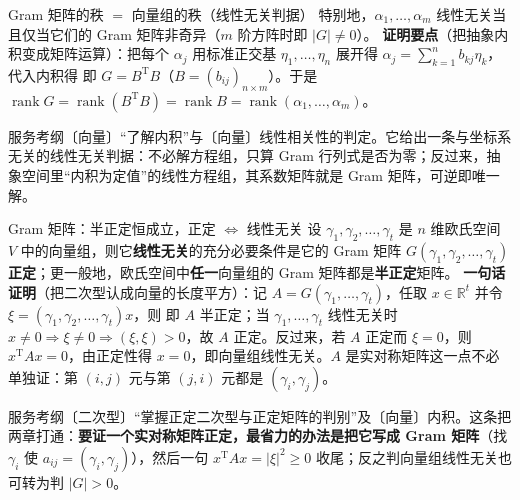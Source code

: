 \begin{fdeep}{Gram 矩阵的秩 $=$ 向量组的秩（线性无关判据）}
特别地，$\alpha_{1},\dots,\alpha_{m}$ 线性无关当且仅当它们的 Gram 矩阵非奇异（$m$ 阶方阵时即 $|G|\ne0$）。
\textbf{证明要点}（把抽象内积变成矩阵运算）：把每个 $\alpha_{j}$ 用标准正交基 $\eta_{1},\dots,\eta_{n}$ 展开得 $\alpha_{j}=\sum_{k=1}^{n}b_{kj}\eta_{k}$，代入内积得
即 $G=B^{\mathrm T}B$（$B=(b_{ij})_{n\times m}$）。于是 $\operatorname{rank}G=\operatorname{rank}(B^{\mathrm T}B)=\operatorname{rank}B=\operatorname{rank}(\alpha_{1},\dots,\alpha_{m})$。

\fbref{}服务考纲〔向量〕“了解内积”与〔向量〕线性相关性的判定。它给出一条与坐标系无关的线性无关判据：不必解方程组，只算 Gram 行列式是否为零；反过来，抽象空间里“内积为定值”的线性方程组，其系数矩阵就是 Gram 矩阵，可逆即唯一解。
\end{fdeep}

\begin{fdeep}{Gram 矩阵：半正定恒成立，正定 $\iff$ 线性无关}
设 $\gamma_{1},\gamma_{2},\dots,\gamma_{t}$ 是 $n$ 维欧氏空间 $V$ 中的向量组，则它\textbf{线性无关}的充分必要条件是它的 Gram 矩阵 $G(\gamma_{1},\gamma_{2},\dots,\gamma_{t})$ \textbf{正定}；更一般地，欧氏空间中\textbf{任一}向量组的 Gram 矩阵都是\textbf{半正定}矩阵。
\textbf{一句话证明}（把二次型认成向量的长度平方）：记 $A=G(\gamma_{1},\dots,\gamma_{t})$，任取 $x\in\mathbb R^{t}$ 并令 $\xi=(\gamma_{1},\gamma_{2},\dots,\gamma_{t})x$，则
即 $A$ 半正定；当 $\gamma_{1},\dots,\gamma_{t}$ 线性无关时 $x\ne0\Rightarrow\xi\ne0\Rightarrow(\xi,\xi)>0$，故 $A$ 正定。反过来，若 $A$ 正定而 $\xi=0$，则 $x^{\mathrm T}Ax=0$，由正定性得 $x=0$，即向量组线性无关。$A$ 是实对称矩阵这一点不必单独证：第 $(i,j)$ 元与第 $(j,i)$ 元都是 $(\gamma_{i},\gamma_{j})$。

\fbref{}服务考纲〔二次型〕“掌握正定二次型与正定矩阵的判别”及〔向量〕内积。这条把两章打通：\textbf{要证一个实对称矩阵正定，最省力的办法是把它写成 Gram 矩阵}（找 $\gamma_{i}$ 使 $a_{ij}=(\gamma_{i},\gamma_{j})$），然后一句 $x^{\mathrm T}Ax=|\xi|^{2}\ge0$ 收尾；反之判向量组线性无关也可转为判 $|G|>0$。
\end{fdeep}

